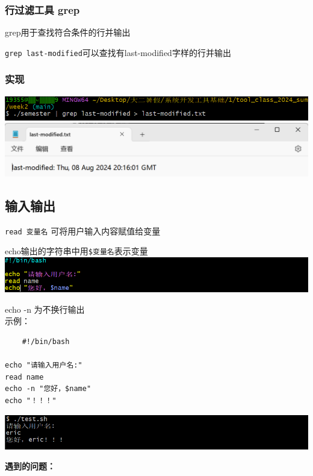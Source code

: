\documentclass[UTF8,a4paper]{ctexart}
\begin{document}
\subsubsection{行过滤工具 grep}
grep用于查找符合条件的行并输出\par
\verb|grep last-modified|\quad 可以查找有last-modified字样的行并输出
\subsubsection{实现}
\begin{center}
\includegraphics[width=1\textwidth]{./pictures/4.1.png}\\
\includegraphics[width=1\textwidth]{./pictures/4.2.png}
\end{center}

\subsection{输入输出}
\verb|read 变量名| \quad 可将用户输入内容赋值给变量\par
echo输出的字符串中用\verb|$变量名|表示变量\\
\includegraphics[width=1\textwidth]{./pictures/变量输入输出1.png}\par
echo -n 为不换行输出\\
示例：
\begin{lstlisting}
    #!/bin/bash

echo "请输入用户名:"
read name
echo -n "您好，$name"
echo "！！！"

\end{lstlisting}
\includegraphics[width=1\textwidth]{./pictures/变量输入输出3.png}\par
\textbf{遇到的问题：}\par
\end{document}
